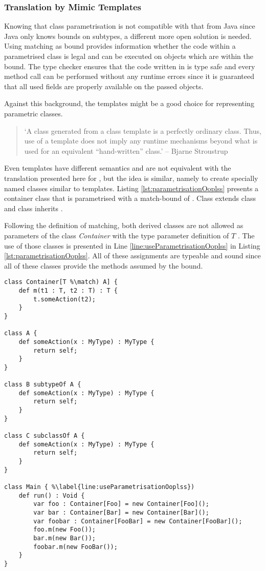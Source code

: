 \subsubsection{Translation by Mimic Templates}
Knowing that \ooplss class parametrisation is not compatible with that
from Java since Java only knows bounds on subtypes, a different more open
solution is needed. Using matching as bound provides information whether
the code within a parametrised class is legal and can be executed on
objects which are within the bound. The type checker ensures that the
code written in \ooplss is type safe and every method call can be
performed without any runtime errors since it is guaranteed that all
used fields are properly available on the passed objects.

Against this background, the \cpp templates might be a good choice for
representing parametric classes.

\begin{quotation}
`A class generated from a class template is a perfectly ordinary
class. Thus, use of a template does not imply any runtime mechanisms
beyond what is used for an equivalent ``hand-written'' class.' -- Bjarne
Stroustrup \cite{stroustrup_c++_2000}
\end{quotation}

Even \cpp templates have different semantics and are not equivalent with
the translation presented here for \ooplss, but the idea is similar,
namely to create specially named classes similar to templates. Listing
\ref{lst:parametrisationOoplss} presents a container class that is
parametrised with a match-bound of \A. Class \B extends class \A and
class \C inherits \A.

Following the definition of matching, both derived classes are not
allowed as parameters of the class \emph{Container} with the type
parameter definition of $T$ \match \A. The use of those classes
is presented in Line \ref{line:useParametrisationOoplss} in Listing
\ref{lst:parametrisationOoplss}. All of these assignments are typeable
and sound since all of these classes provide the methods assumed
by the bound.

\begin{lstlisting}[language=ooplss,caption=Parametrisation in \ooplss.,label=lst:parametrisationOoplss]
class Container[T %\match) A] {
	def m(t1 : T, t2 : T) : T {
		t.someAction(t2);
	}
}

class A {
	def someAction(x : MyType) : MyType {
		return self;
	}
}

class B subtypeOf A {
	def someAction(x : MyType) : MyType {
		return self;
	}
}

class C subclassOf A {
	def someAction(x : MyType) : MyType {
		return self;
	}
}

class Main { %\label{line:useParametrisationOoplss})
	def run() : Void {
		var foo : Container[Foo] = new Container[Foo]();
		var bar : Container[Bar] = new Container[Bar]();
		var foobar : Container[FooBar] = new Container[FooBar]();
		foo.m(new Foo());
		bar.m(new Bar());
		foobar.m(new FooBar());
	}
}
\end{lstlisting}

